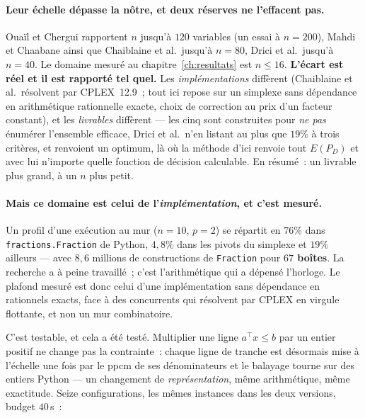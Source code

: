 \documentclass[12pt,a4paper]{report}
\newcommand{\E}{E(P_D)}
\theoremstyle{plain}
\theoremstyle{definition}
\begin{document}
\paragraph{Leur échelle dépasse la nôtre, et deux réserves ne l'effacent
pas.}
Oua\"il et Chergui rapportent $n$ jusqu'à $120$ variables (un essai à
$n=200$), Mahdi et Chaabane ainsi que Chaiblaine et al.\ jusqu'à $n=80$,
Drici et al.\ jusqu'à $n=40$.  Le domaine mesuré au
chapitre~\ref{ch:resultats} est $n \leqslant 16$.  \textbf{L'écart est réel
et il est rapporté tel quel.}  Les \emph{implémentations} diffèrent
(Chaiblaine et al.\ résolvent par CPLEX~12.9~; tout ici repose sur un
simplexe sans dépendance en arithmétique rationnelle exacte, choix de
correction au prix d'un facteur constant), et les \emph{livrables} diffèrent
--- les cinq sont construites pour \emph{ne pas} énumérer l'ensemble
efficace, Drici et al.\ n'en listant au plus que $19\%$ à trois critères,
et renvoient un optimum, là où la méthode d'ici renvoie tout $\E$ et avec
lui n'importe quelle fonction de décision calculable.  En résumé~: un
livrable plus grand, à un $n$ plus petit.

\paragraph{Mais ce domaine est celui de l'\emph{implémentation}, et c'est
mesuré.}
Un profil d'une exécution au mur ($n = 10$, $p = 2$) se répartit en $76\%$
dans \texttt{fractions.Fraction} de Python, $4{,}8\%$ dans les pivots du
simplexe et $19\%$ ailleurs --- avec $8{,}6$ millions de constructions de
\texttt{Fraction} pour \textbf{$67$ boîtes}.  La recherche a à peine
travaillé~; c'est l'arithmétique qui a dépensé l'horloge.  Le plafond mesuré
est donc celui d'une implémentation sans dépendance en rationnels exacts,
face à des concurrents qui résolvent par CPLEX en virgule flottante, et non
un mur combinatoire.

C'est testable, et cela a été testé.  Multiplier une ligne
$a^{\top}x \leqslant b$ par un entier positif ne change pas la contrainte~:
chaque ligne de tranche est désormais mise à l'échelle une fois par le ppcm
de ses dénominateurs et le balayage tourne sur des entiers Python --- un
changement de \emph{représentation}, même arithmétique, même exactitude.
Seize configurations, les mêmes instances dans les deux versions, budget
$40$\,s~:
\end{document}
